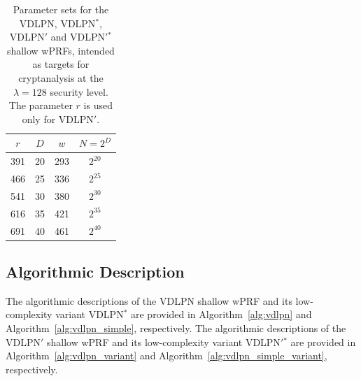\documentclass[journal=tosc,submission]{iacrtrans}
\theoremstyle{theorem}
\renewcommand\secpar{\ensuremath{\lambda}\xspace}
\newcommand\yr[1]{\textcolor{brown!80}{\textbf{Yann:} #1}}
\begin{document}


\begin{table}[!ht]
\centering
\begin{tabular}{cccc} 
\toprule
$r$ & $D$ &  $w$ & $N = 2^D$\\
\midrule
391 & 20 & 293 & $2^{20}$\\
466 & 25 & 336 & $2^{25}$\\
541 & 30 & 380 & $2^{30}$\\
616 & 35 & 421 & $2^{35}$\\
691 & 40 & 461 & $2^{40}$\\
\bottomrule
\end{tabular}
\caption{\label{tab:vdlpn-param}Parameter sets for the {\sf VDLPN}, {\sf VDLPN}$^*$, {\sf VDLPN}$'$ and {{\sf VDLPN}$'$}$^*$ shallow wPRFs, intended as targets for cryptanalysis at the $\secpar = 128$ security level. The parameter $r$ is used only for {\sf VDLPN}$'$.}
\end{table}

\subsection{Algorithmic Description}

The algorithmic descriptions of the {\sf VDLPN} shallow wPRF and its low-complexity variant {\sf VDLPN}$^*$ are provided in Algorithm~\ref{alg:vdlpn} and Algorithm~\ref{alg:vdlpn_simple}, respectively. The algorithmic descriptions of the {\sf VDLPN}$'$ shallow wPRF and its low-complexity variant {{\sf VDLPN}$'$}$^*$ are provided in Algorithm~\ref{alg:vdlpn_variant} and Algorithm~\ref{alg:vdlpn_simple_variant}, respectively.
\end{document}
